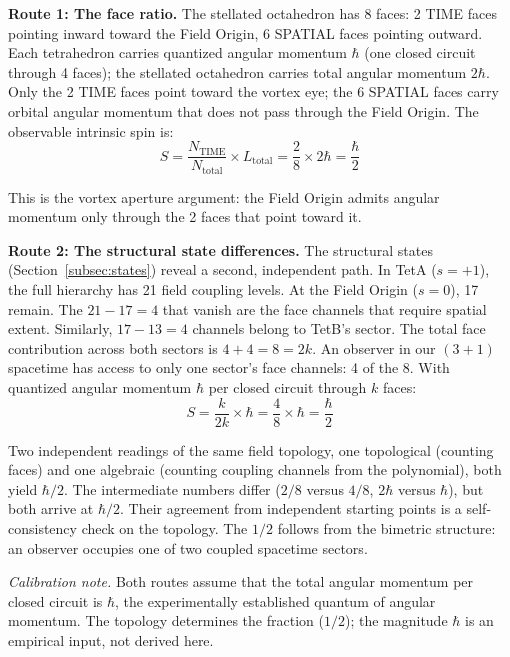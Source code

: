 \documentclass[aps,prd,preprint,superscriptaddress,showpacs,preprintnumbers,amsmath,amssymb,nofootinbib]{revtex4-2}
\begin{document}
\textbf{Route 1: The face ratio.} The stellated octahedron has 8 faces: 2 TIME faces pointing inward toward the Field Origin, 6 SPATIAL faces pointing outward. Each tetrahedron carries quantized angular momentum $\hbar$ (one closed circuit through 4 faces); the stellated octahedron carries total angular momentum $2\hbar$. Only the 2 TIME faces point toward the vortex eye; the 6 SPATIAL faces carry orbital angular momentum that does not pass through the Field Origin. The observable intrinsic spin is:
\begin{equation}
S = \frac{N_{\text{TIME}}}{N_{\text{total}}} \times L_{\text{total}} = \frac{2}{8} \times 2\hbar = \frac{\hbar}{2}
\label{eq:spin}
\end{equation}

This is the vortex aperture argument: the Field Origin admits angular momentum only through the 2 faces that point toward it.

\textbf{Route 2: The structural state differences.} The structural states (Section~\ref{subsec:states}) reveal a second, independent path. In TetA ($s = +1$), the full hierarchy has 21 field coupling levels. At the Field Origin ($s = 0$), 17 remain. The $21 - 17 = 4$ that vanish are the face channels that require spatial extent. Similarly, $17 - 13 = 4$ channels belong to TetB's sector. The total face contribution across both sectors is $4 + 4 = 8 = 2k$. An observer in our $(3{+}1)$ spacetime has access to only one sector's face channels: 4 of the 8. With quantized angular momentum $\hbar$ per closed circuit through $k$ faces:
\begin{equation}
S = \frac{k}{2k} \times \hbar = \frac{4}{8} \times \hbar = \frac{\hbar}{2}
\label{eq:spin-route2}
\end{equation}

Two independent readings of the same field topology, one topological (counting faces) and one algebraic (counting coupling channels from the polynomial), both yield $\hbar/2$. The intermediate numbers differ ($2/8$ versus $4/8$, $2\hbar$ versus $\hbar$), but both arrive at $\hbar/2$. Their agreement from independent starting points is a self-consistency check on the topology. The $1/2$ follows from the bimetric structure: an observer occupies one of two coupled spacetime sectors.

\noindent\textit{Calibration note.} Both routes assume that the total angular momentum per closed circuit is $\hbar$, the experimentally established quantum of angular momentum. The topology determines the fraction ($1/2$); the magnitude $\hbar$ is an empirical input, not derived here.
\end{document}
